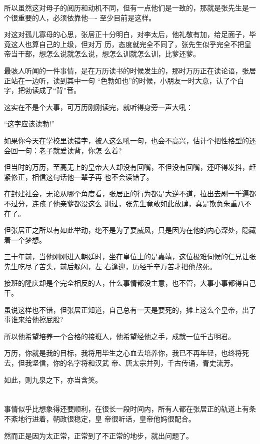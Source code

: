 \documentclass[11pt,a4paper,onecolumn]{article}
\begin{document}
所以虽然这对母子的阅历和动机不同，但有一点他们是一致的，那就是张先生是一个很重要的人，必须依靠他----
至少目前是这样。

对这对孤儿寡母的心思，张居正十分明白，对李太后，他礼敬有加，给足面子，毕竟这人也算自己的上级，但对万
历，态度就完全不同了，张先生似乎完全不把皇帝当干部，想怎么说就怎么说，想怎么训就怎么训，比爹还爹。

最骇人听闻的一件事情，是在万历读书的时候发生的，那时万历正在读论语，张居正站在一边听，读到其中一句
``色勃如也''的时候，小朋友一时大意，认了个白字，把勃读成了``背''音。

这实在不是个大事，可万历刚刚读完，就听得身旁一声大吼：

``这字应该读勃!''

如果你今天在学校里读错字，被人这么吼一句，也会不高兴，估计个把性格型的还会回一句：老子就爱读背，你怎
么着?

但当时的万历，至高无上的皇帝大人却没有回嘴，不但没有回嘴，还吓得发抖，赶紧修正，相信这句话他一辈子再
也不会读错了。

在封建社会，无论从哪个角度看，张居正的行为都是大逆不道，拉出去剐一千遍都不过分，连孩子他亲爹都没这么
训过，张先生竟敢如此放肆，真是欺负朱重八不在了。

但张居正之所以有如此举动，绝不是为了耍威风，只是因为在他的内心深处，隐藏着一个梦想。

三十年前，当他刚刚进入朝廷时，坐在皇位上的是嘉靖，这位极难伺候的仁兄让张先生吃尽了苦头，前后躲闪，左
右逢迎，历经千辛万苦才把他熬死。

接班的隆庆却是个完全相反的人，什么事情都没主意，也不管，大事小事都得自己干。

虽说这样也不错，但张居正知道，自己总有一天是要死的，摊上这么个皇帝，出了事谁来给他擦屁股?

所以他希望培养一个合格的接班人，他希望经他之手，成就一位千古明君。

万历，你就是我的目标，我将用毕生之心血去培养你，我已不再年轻，也终将死去，但我坚信，你的名字将和汉武
帝、唐太宗并列，千古传诵，青史流芳。

如此，则九泉之下，亦当含笑。

\section[\thesection]{}

事情似乎比想象得还要顺利，在很长一段时间内，所有人都在张居正的轨道上有条不紊地行进着，朝政很稳定，皇
帝很听话，皇帝他妈很配合。

然而正是因为太正常，正常到了不正常的地步，就出问题了。
\end{document}
